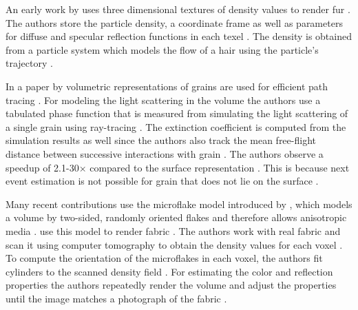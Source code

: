An early work by \citeauthor{kajiya_rendering_fur_with_textures} uses three dimensional textures of density values to render fur \cite{kajiya_rendering_fur_with_textures}.
The authors store the particle density, a coordinate frame as well as parameters for diffuse and specular reflection functions in each texel \cite{kajiya_rendering_fur_with_textures}.
The density is obtained from a particle system which models the flow of a hair using the particle's trajectory \cite{kajiya_rendering_fur_with_textures}.

In a paper by \citeauthor{meng_multi_scale_modeling_and_rendering_of_granular_materials} volumetric representations of grains are used for efficient path tracing \cite{meng_multi_scale_modeling_and_rendering_of_granular_materials}.
For modeling the light scattering in the volume the authors use a tabulated phase function that is measured from simulating the light scattering of a single grain using ray-tracing \cite{meng_multi_scale_modeling_and_rendering_of_granular_materials}.
The extinction coefficient is computed from the simulation results as well since the authors also track the mean free-flight distance between successive interactions with grain \cite{meng_multi_scale_modeling_and_rendering_of_granular_materials}.
The authors observe a speedup of 2.1-30$\times$ compared to the surface representation \cite{meng_multi_scale_modeling_and_rendering_of_granular_materials}.
This is because next event estimation is not possible for grain that does not lie on the surface \cite{meng_multi_scale_modeling_and_rendering_of_granular_materials}.

Many recent contributions use the microflake model introduced by \citeauthor{microflake}, which models a volume by two-sided, randomly oriented flakes and therefore allows anisotropic media \cite{microflake}.
\citeauthor{zhao_building_volumetric_appearance_models} use this model to render fabric \cite{zhao_building_volumetric_appearance_models}.
The authors work with real fabric and scan it using computer tomography to obtain the density values for each voxel \cite{zhao_building_volumetric_appearance_models}.
To compute the orientation of the microflakes in each voxel, the authors fit cylinders to the scanned density field \cite{zhao_building_volumetric_appearance_models}.
For estimating the color and reflection properties the authors repeatedly render the volume and adjust the properties until the image matches a photograph of the fabric \cite{zhao_building_volumetric_appearance_models}.

